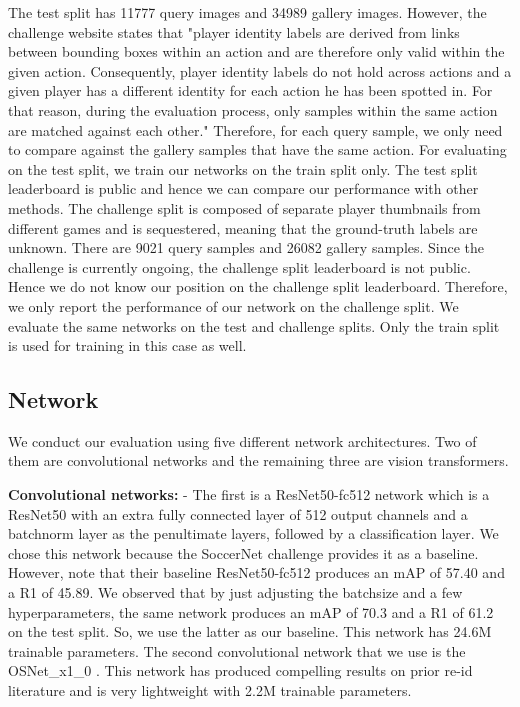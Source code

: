 \documentclass{article}
\begin{document}
The test split has 11777 query images and 34989 gallery images. However, the challenge website \cite{soccerNetv3} states that "player identity labels are derived from links between bounding boxes within an action and are therefore only valid within the given action. Consequently, player identity labels do not hold across actions and a given player has a different identity for each action he has been spotted in. For that reason, during the evaluation process, only samples within the same action are matched against each other." Therefore, for each query sample, we only need to compare against the gallery samples that have the same action. For evaluating on the test split, we train our networks on the train split only. The test split leaderboard is public and hence we can compare our performance with other methods.
The challenge split is composed of separate player thumbnails from different games and is sequestered, meaning that the ground-truth labels are unknown. There are 9021 query samples and 26082 gallery samples. Since the challenge is currently ongoing, the challenge split leaderboard is not public. Hence we do not know our position on the challenge split leaderboard. Therefore, we only report the performance of our network on the challenge split. We evaluate the same networks on the test and challenge splits. Only the train split is used for training in this case as well.

\subsection{Network}
\label{sec:network}
We conduct our evaluation using five different network architectures. Two of them are convolutional networks and the remaining three are vision transformers.

\textbf{Convolutional networks:} - The first is a ResNet50-fc512 network which is a ResNet50 \cite{he2016deep} with an extra fully connected layer of 512 output channels and a batchnorm layer as the penultimate layers, followed by a classification layer. We chose this network because the SoccerNet challenge provides it as a baseline. However, note that their baseline ResNet50-fc512 produces an mAP of 57.40 and a R1 of 45.89. We observed that by just adjusting the batchsize and a few hyperparameters, the same network produces an mAP of 70.3 and a R1 of 61.2 on the test split. So, we use the latter as our baseline. This network has 24.6M trainable parameters. The second convolutional network that we use is the OSNet\_x1\_0 \cite{zhou2019omni,zhou2021learning}. This network has produced compelling results on prior re-id literature and is very lightweight with 2.2M trainable parameters.
\end{document}
